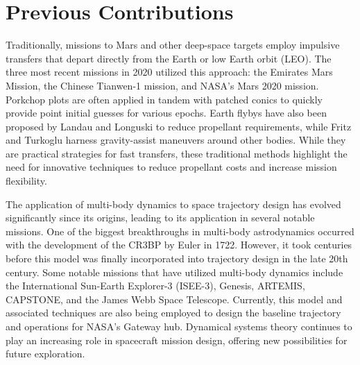\section{Previous Contributions}
Traditionally, missions to Mars and other deep-space targets employ impulsive transfers that depart
directly from the Earth or low Earth orbit (LEO). The three most recent missions in 2020 utilized
this approach: the Emirates Mars Mission\cite{Amiri:2022}, the Chinese Tianwen-1
mission\cite{Yang:2022}, and NASA's Mars 2020 mission\cite{Farley:2020}. Porkchop plots are often
applied in tandem with patched conics to quickly provide point initial guesses for various
epochs\cite{Drake:2009}. Earth flybys have also been proposed by Landau and Longuski to reduce
propellant requirements\cite{Landau:2006}, while Fritz and Turkoglu harness gravity-assist
maneuvers around other bodies\cite{Fritz:2016}. While they are practical strategies for fast
transfers, these traditional methods highlight the need for innovative techniques to reduce
propellant costs and increase mission flexibility.

The application of multi-body dynamics to space trajectory design has evolved significantly since
its origins, leading to its application in several notable missions. One of the biggest
breakthroughs in multi-body astrodynamics occurred with the development of the CR3BP by Euler in
1722\cite{BarrowGreen:1997}. However, it took centuries before this model was finally incorporated
into trajectory design in the late 20th century. Some notable missions that have utilized
multi-body dynamics include the International Sun-Earth Explorer-3 (ISEE-3)\cite{Farquhar:1984},
Genesis\cite{Lo:2001}, ARTEMIS\cite{Woodard:2009}, CAPSTONE\cite{Cheetham:2021}, and the James Webb
Space Telescope\cite{Menzel:2023}. Currently, this model and associated techniques are also being
employed to design the baseline trajectory and operations for NASA's Gateway
hub\cite{Zamora:2024,Boudad:2022,ZimovanSpreen:2022}. Dynamical systems theory continues to play an
increasing role in spacecraft mission design, offering new possibilities for future exploration.


